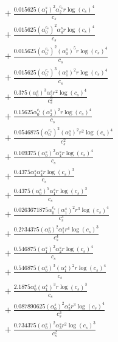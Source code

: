 \documentclass[10pt]{article}
\begin{document}
\begin{align*}
&{}  + \frac{0.015625 \left(\alpha_{1}^s\right)^{2} \alpha_{2}^{c_s} r \log{\left(c_{s} \right)}^{4}}{c_{s}} \\
&{}  + \frac{0.015625 \left(\alpha_{0}^{c_s}\right)^{2} \alpha_{4}^s r \log{\left(c_{s} \right)}^{4}}{c_{s}} \\
&{}  + \frac{0.015625 \left(\alpha_{0}^{c_s}\right)^{2} \left(\alpha_{0}^s\right)^{5} r \log{\left(c_{s} \right)}^{4}}{c_{s}} \\
&{}  + \frac{0.015625 \left(\alpha_{0}^{c_s}\right)^{3} \left(\alpha_{1}^s\right)^{2} r \log{\left(c_{s} \right)}^{4}}{c_{s}} \\
&{}  + \frac{0.375 \left(\alpha_{0}^s\right)^{3} \alpha_{2}^s r^{2} \log{\left(c_{s} \right)}^{4}}{c_{s}^{2}} \\
&{}  + \frac{0.15625 \alpha_{0}^{c_s} \left(\alpha_{2}^s\right)^{2} r \log{\left(c_{s} \right)}^{4}}{c_{s}} \\
&{}  + \frac{0.0546875 \left(\alpha_{0}^{c_s}\right)^{2} \left(\alpha_{1}^s\right)^{2} r^{2} \log{\left(c_{s} \right)}^{4}}{c_{s}^{2}} \\
&{}  + \frac{0.109375 \left(\alpha_{0}^s\right)^{2} \alpha_{4}^s r \log{\left(c_{s} \right)}^{4}}{c_{s}} \\
&{}  + \frac{0.4375 \alpha_{1}^s \alpha_{4}^s r \log{\left(c_{s} \right)}^{3}}{c_{s}} \\
&{}  + \frac{0.4375 \left(\alpha_{0}^s\right)^{5} \alpha_{1}^s r \log{\left(c_{s} \right)}^{3}}{c_{s}} \\
&{}  + \frac{0.0263671875 \alpha_{0}^{c_s} \left(\alpha_{1}^s\right)^{2} r^{3} \log{\left(c_{s} \right)}^{4}}{c_{s}^{3}} \\
&{}  + \frac{0.2734375 \left(\alpha_{0}^s\right)^{2} \alpha_{1}^s r^{4} \log{\left(c_{s} \right)}^{3}}{c_{s}^{4}} \\
&{}  + \frac{0.546875 \left(\alpha_{1}^s\right)^{2} \alpha_{2}^s r \log{\left(c_{s} \right)}^{4}}{c_{s}} \\
&{}  + \frac{0.546875 \left(\alpha_{0}^s\right)^{3} \left(\alpha_{1}^s\right)^{2} r \log{\left(c_{s} \right)}^{4}}{c_{s}} \\
&{}  + \frac{2.1875 \alpha_{0}^s \left(\alpha_{1}^s\right)^{3} r \log{\left(c_{s} \right)}^{3}}{c_{s}} \\
&{}  + \frac{0.087890625 \left(\alpha_{0}^s\right)^{2} \alpha_{2}^s r^{3} \log{\left(c_{s} \right)}^{4}}{c_{s}^{3}} \\
&{}  + \frac{0.734375 \left(\alpha_{0}^s\right)^{2} \alpha_{3}^s r^{2} \log{\left(c_{s} \right)}^{3}}{c_{s}^{2}} \\

\end{align*}
\end{document}
